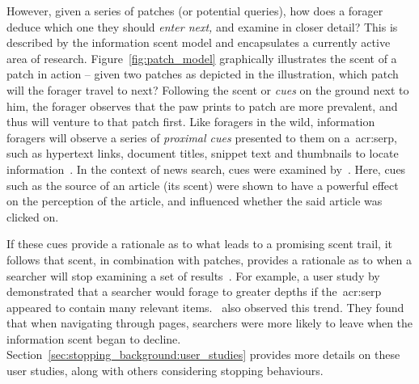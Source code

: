 However, given a series of patches (or potential queries), how does a forager deduce which one they should \emph{enter next,} and examine in closer detail? This is described by the information scent model and encapsulates a currently active area of research. Figure~\ref{fig:patch_model} graphically illustrates the scent of a patch in action -- given two patches as depicted in the illustration, which patch will the forager travel to next? Following the scent or \emph{cues} on the ground next to him, the forager observes that the paw prints to patch  are more prevalent, and thus will venture to that patch first. Like foragers in the wild, information foragers will observe a series of \emph{proximal cues} presented to them on a~\gls{acr:serp}, such as hypertext links, document titles, snippet text and thumbnails to locate information~\citep{pirolli1995ift, pirolli1999ift, chi2001information_scent, oltston2003scenttrails, pirolli2007ift}. In the context of news search, cues were examined by~\cite{sundar2007news_scent}. Here, cues such as the source of an article (its scent) were shown to have a powerful effect on the perception of the article, and influenced whether the said article was clicked on.

If these cues provide a rationale as to what leads to a promising scent trail, it follows that scent, in combination with patches, provides a rationale as to when a searcher will stop examining a set of results~\citep{pirolli1999ift, wu2012dc, wu2014information_scent}. For example, a user study by~\cite{wu2014information_scent} demonstrated that a searcher would forage to greater depths if the~\gls{acr:serp} appeared to contain many relevant items.~\cite{card2001scent_graphs} also observed this trend. They found that when navigating through pages, searchers were more likely to leave when the information scent began to decline. Section~\ref{sec:stopping_background:user_studies} provides more details on these user studies, along with others considering stopping behaviours.


